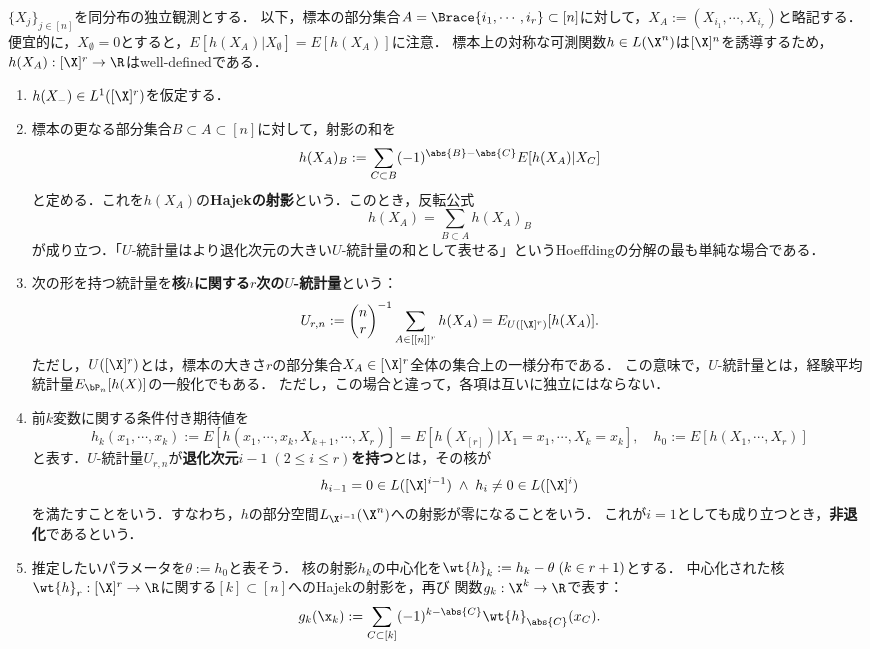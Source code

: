 \documentclass[uplatex,dvipdfmx]{jsreport}
\begin{document}
\begin{model}[$U$-統計量が構成可能な模型]\label{model-for-U-statistic}
    $\{X_j\}_{j\in[n]}$を同分布の独立観測とする．
    以下，標本の部分集合$A=\Brace{i_1,\cdots,i_r}\subset[n]$に対して，$X_A:=(X_{i_1},\cdots,X_{i_r})$と略記する．
    便宜的に，$X_\emptyset=0$とすると，$E[h(X_A)|X_\emptyset]=E[h(X_A)]$に注意．
    標本上の対称な可測関数$h\in L(\X^n)$は$[\X]^n$を誘導するため，$h(X_A):[\X]^r\to\R$はwell-definedである．
    \begin{enumerate}
        \item $h(X_-)\in L^1([\X]^r)$を仮定する．
        \item 標本の更なる部分集合$B\subset A\subset[n]$に対して，射影の和を
        \[h(X_A)_B:=\sum_{C\subset B}(-1)^{\abs{B}-\abs{C}}E[h(X_A)|X_C]\]
        と定める．これを$h(X_A)$の\textbf{Hajekの射影}という．このとき，反転公式
        \[h(X_A)=\sum_{B\subset A}h(X_A)_B\]
        が成り立つ．「$U$-統計量はより退化次元の大きい$U$-統計量の和として表せる」というHoeffdingの分解の最も単純な場合である．
        \item 次の形を持つ統計量を\textbf{核$h$に関する$r$次の$U$-統計量}という：
        \[U_{r,n}:=\begin{pmatrix}n\\r\end{pmatrix}^{-1}\sum_{A\in [[n]]^r}h(X_A)=E_{U([\X]^r)}[h(X_A)].\]
        ただし，$U([\X]^r)$とは，標本の大きさ$r$の部分集合$X_A\in[\X]^r$全体の集合上の一様分布である．
        この意味で，$U$-統計量とは，経験平均統計量$E_{\bP_n}[h(X)]$の一般化でもある．
        ただし，この場合と違って，各項は互いに独立にはならない．
        \item 前$k$変数に関する条件付き期待値を
        \[h_k(x_1,\cdots,x_k):=E[h(x_1,\cdots,x_k,X_{k+1},\cdots,X_r)]=E[h(X_{[r]})|X_1=x_1,\cdots,X_k=x_k],\quad h_0:=E[h(X_1,\cdots,X_r)]\]
        と表す．$U$-統計量$U_{r,n}$が\textbf{退化次元$i-1\;(2\le i\le r)$を持つ}とは，その核が
        \[h_{i-1}=0\in L([\X]^{i-1})\;\land\;h_i\ne0\in L([\X]^i)\]
        を満たすことをいう．すなわち，$h$の部分空間$L_{\X^{i-1}}(\X^n)$への射影が零になることをいう．
        これが$i=1$としても成り立つとき，\textbf{非退化}であるという．
        \item 推定したいパラメータを$\theta:=h_0$と表そう．
        核の射影$h_k$の中心化を$\wt{h}_k:=h_k-\theta\;(k\in r+1)$とする．
        中心化された核$\wt{h}_r:[\X]^r\to\R$に関する$[k]\subset[n]$へのHajekの射影を，再び
        関数$g_k:\X^k\to\R$で表す：
        \[g_k(\x_k):=\sum_{C\subset[k]}(-1)^{k-\abs{C}}\wt{h}_{\abs{C}}(x_C).\]

\end{enumerate}
\end{model}
\end{document}
